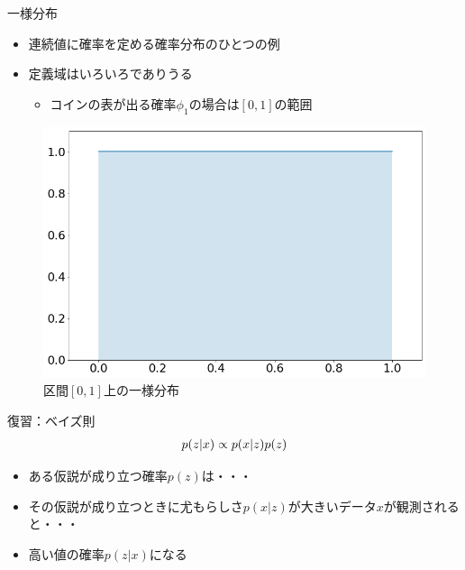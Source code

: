 \documentclass[aspectratio=169,unicode,dvipdfmx,14pt]{beamer}
\begin{document}
\begin{frame}{一様分布}
\begin{itemize}
\item 連続値に確率を定める確率分布のひとつの例
\item 定義域はいろいろでありうる
\begin{itemize}
\item コインの表が出る確率$\phi_1$の場合は$[0,1]$の範囲
\end{itemize}
\end{itemize}
\begin{figure}[htbp]
\begin{center}
\includegraphics[scale=0.27]{uniform_dist.png}
\vspace{-.2in}
\caption{区間$[0,1]$上の一様分布}
\label{}
\end{center}
\end{figure}
\end{frame}

\begin{frame}{復習：ベイズ則}
\vspace{-.4in}
{\Large
\begin{align}
p(z|x) \propto p(x|z)p(z)
\notag
\end{align}
}%
\vspace{-.2in}
\begin{itemize}
\item ある仮説が成り立つ確率$p(z)$は・・・
\item その仮説が成り立つときに尤もらしさ$p(x|z)$が大きいデータ$x$が観測されると・・・
\item 高い値の確率$p(z|x)$になる
\end{itemize}
\end{frame}
\end{document}
